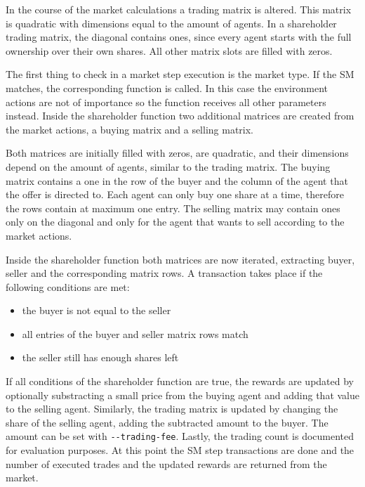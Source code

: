 In the course of the market calculations a trading matrix is altered. This matrix is quadratic with dimensions equal to the amount of agents. In a shareholder trading matrix, the diagonal contains ones, since every agent starts with the full ownership over their own shares. All other matrix slots are filled with zeros.

The first thing to check in a market step execution is the market type. If the SM matches, the corresponding function is called. In this case the environment actions are not of importance so the function receives all other parameters instead. Inside the shareholder function two additional matrices are created from the market actions, a buying matrix and a selling matrix.

Both matrices are initially filled with zeros, are quadratic, and their dimensions depend on the amount of agents, similar to the trading matrix. The buying matrix contains a one in the row of the buyer and the column of the agent that the offer is directed to.
Each agent can only buy one share at a time, therefore the rows contain at maximum one entry. The selling matrix may contain ones only on the diagonal and only for the agent that wants to sell according to the market actions.

Inside the shareholder function both matrices are now iterated, extracting buyer, seller and the corresponding matrix rows. A transaction takes place if the following conditions are met:
\begin{itemize}
    \item the buyer is not equal to the seller
    \item all entries of the buyer and seller matrix rows match
    \item the seller still has enough shares left
\end{itemize}

If all conditions of the shareholder function are true, the rewards are updated by optionally substracting a small price from the buying agent and adding that value to the selling agent. Similarly, the trading matrix is updated by changing the share of the selling agent, adding the subtracted amount to the buyer. The amount can be set with \verb|--trading-fee|. Lastly, the trading count is documented for evaluation purposes. At this point the SM step transactions are done and the number of executed trades and the updated rewards are returned from the market.

